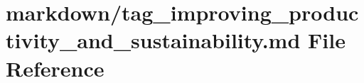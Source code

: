 \hypertarget{tag__improving__productivity__and__sustainability_8md}{}\section{markdown/tag\+\_\+improving\+\_\+productivity\+\_\+and\+\_\+sustainability.md File Reference}
\label{tag__improving__productivity__and__sustainability_8md}

